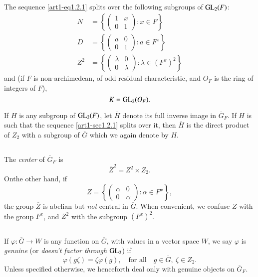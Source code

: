 \subsection{}\label{art1-sec1.3}
The sequence \eqref{art1-eq1.2.1} splits over the following subgroups of $\mathrm{GL}_{2}(F)$:
\begin{align*}
N &= \left\{ \left(\begin{matrix} 1 & x\\ 0 & 1\end{matrix}\right):x\in F\right\}\\[4pt]
D &= \left\{ \left(\begin{matrix} a & 0\\ 0 & 1\end{matrix}\right):a\in F^{x}\right\}\\[4pt]
Z^{2} &= \left\{ \left(\begin{matrix} \lambda & 0\\ 0 & \lambda\end{matrix}\right):\lambda\in (F^{x})^{2}\right\}
\end{align*}
and (if $F$ is non-archimedean, of odd residual characteristic, and $O_{F}$ is the ring of integers of $F$),
$$
K=\mathrm{GL}_{2}(O_{F}).
$$

If $H$ is any subgroup of $\mathrm{GL}_{2}(F)$, let $\overline{H}$ denote its full inverse image in $\overline{G}_{F}$. If $H$ is such that the sequence \eqref{art1-sec1.2.1} splits over it, then $\overline{H}$ is the direct product of $Z_{2}$ with a subgroup of $\overline{G}$ which we again denote by $H$.

\subsection{}\label{art1-sec1.4}
The {\em center} of $\overline{G}_{F}$ is
$$
\overline{Z}^{2}=Z^{2}\times Z_{2}.
$$
On\pageoriginale the other hand, if
$$
Z=\left\{\left(\begin{matrix} \alpha & 0\\ 0 & \alpha\end{matrix}\right):\alpha\in F^{x}\right\},
$$
the group $\overline{Z}$ is abelian but {\em not} central in $\overline{G}$. When convenient, we confuse $Z$ with the group $F^{x}$, and $Z^{2}$ with the subgroup $(F^{x})^{2}$.

\subsection{}\label{art1-sec1.5}
If $\varphi : \overline{G}\to W$ is any function on $\overline{G}$, with values in a vector space $W$, we say $\varphi$ is {\em genuine} (or {\em doesn't factor through} $\mathrm{GL}_{2}$) if 
$$
\varphi(g\zeta)=\zeta\varphi(g),\quad\text{for all}\quad g\in \overline{G}, \ \zeta\in Z_{2}.
$$
Unless specified otherwise, we henceforth deal only with genuine objects on $\overline{G}_{F}$.

